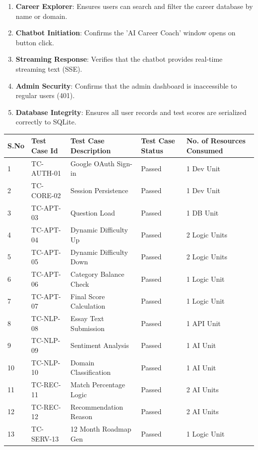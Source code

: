 \begin{enumerate}
    \item \textbf{Career Explorer}: Ensures users can search and filter the career database by name or domain.
    \item \textbf{Chatbot Initiation}: Confirms the 'AI Career Coach' window opens on button click.
    \item \textbf{Streaming Response}: Verifies that the chatbot provides real-time streaming text (SSE).
    \item \textbf{Admin Security}: Confirms that the admin dashboard is inaccessible to regular users (401).
    \item \textbf{Database Integrity}: Ensures all user records and test scores are serialized correctly to SQLite.
\end{enumerate}

\begin{table}[H]
\begin{center}
 \begin{tabular}{| m{1cm} | m{1.5cm} | m{7em}| m{4em}| m{5em} |} 
 \hline
 S.No & Test Case Id & Test Case Description & Test Case Status & No. of Resources Consumed \\
 \hline
 1 & TC-AUTH-01 & Google OAuth Sign-in & Passed & 1 Dev Unit \\ 
 \hline
 2 & TC-CORE-02 & Session Persistence & Passed & 1 Dev Unit \\
 \hline
 3 & TC-APT-03 & Question Load & Passed & 1 DB Unit \\
 \hline
 4 & TC-APT-04 & Dynamic Difficulty Up & Passed & 2 Logic Units \\
 \hline
 5 & TC-APT-05 & Dynamic Difficulty Down & Passed & 2 Logic Units \\
 \hline
 6 & TC-APT-06 & Category Balance Check & Passed & 1 Logic Unit \\
 \hline
 7 & TC-APT-07 & Final Score Calculation & Passed & 1 Logic Unit \\
 \hline
 8 & TC-NLP-08 & Essay Text Submission & Passed & 1 API Unit \\
 \hline
 9 & TC-NLP-09 & Sentiment Analysis & Passed & 1 AI Unit \\
 \hline
 10 & TC-NLP-10 & Domain Classification & Passed & 1 AI Unit \\
 \hline
 11 & TC-REC-11 & Match Percentage Logic & Passed & 2 AI Units \\
 \hline
 12 & TC-REC-12 & Recommendation Reason & Passed & 2 AI Units \\
 \hline
 13 & TC-SERV-13 & 12 Month Roadmap Gen & Passed & 1 Logic Unit \\

\end{tabular}
\end{center}
\end{table}
